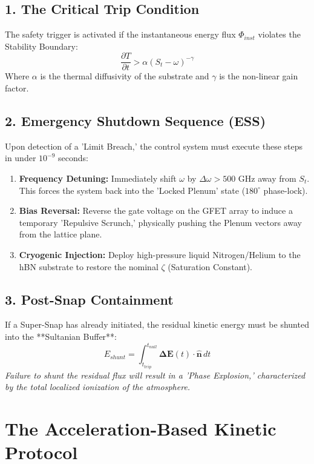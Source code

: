 \documentclass[11pt]{article}
\begin{document}
\subsection*{1. The Critical Trip Condition}
The safety trigger is activated if the instantaneous energy flux $\Phi_{inst}$ violates the Stability Boundary:
\begin{equation}
    \frac{\partial T}{\partial t} > \alpha \left( S_t - \omega \right)^{-\gamma}
\end{equation}
Where $\alpha$ is the thermal diffusivity of the substrate and $\gamma$ is the non-linear gain factor.

\subsection*{2. Emergency Shutdown Sequence (ESS)}
Upon detection of a 'Limit Breach,' the control system must execute these steps in under $10^{-9}$ seconds:

\begin{enumerate}
    \item \textbf{Frequency Detuning:} Immediately shift $\omega$ by $\Delta \omega > 500$ GHz away from $S_t$. This forces the system back into the 'Locked Plenum' state ($180^\circ$ phase-lock).
    \item \textbf{Bias Reversal:} Reverse the gate voltage on the GFET array to induce a temporary 'Repulsive Scrunch,' physically pushing the Plenum vectors away from the lattice plane.
    \item \textbf{Cryogenic Injection:} Deploy high-pressure liquid Nitrogen/Helium to the hBN substrate to restore the nominal $\zeta$ (Saturation Constant).
\end{enumerate}

\subsection*{3. Post-Snap Containment}
If a Super-Snap has already initiated, the residual kinetic energy must be shunted into the **Sultanian Buffer**:
\begin{equation}
    E_{shunt} = \int_{t_{trip}}^{t_{null}} \mathbf{\Delta E}(t) \cdot \mathbf{\hat{n}} \, dt
\end{equation}
\textit{Failure to shunt the residual flux will result in a 'Phase Explosion,' characterized by the total localized ionization of the atmosphere.}



\section*{The Acceleration-Based Kinetic Protocol}
\end{document}
